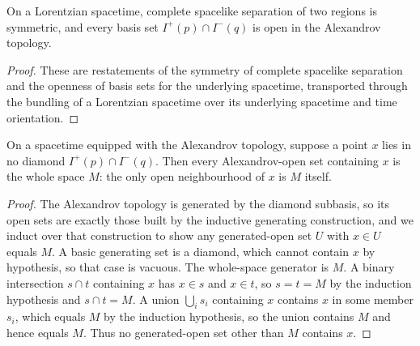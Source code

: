 \begin{lemma}
    \label{lmm:lorentzian-causal-lifts}
    \leanok
    On a Lorentzian spacetime, complete spacelike separation of two regions is symmetric, and every basis set $I^+(p) \cap I^-(q)$ is open in the Alexandrov topology.
\end{lemma}
\begin{proof}
    \leanok
    These are restatements of the symmetry of complete spacelike separation and the openness of basis sets for the underlying spacetime, transported through the bundling of a Lorentzian spacetime over its underlying spacetime and time orientation.
\end{proof}

\medskip

\begin{lemma}
    \label{lmm:alexandrov-nbhd-univ-of-no-diamond}
    \leanok
    On a spacetime equipped with the Alexandrov topology, suppose a point $x$ lies in no diamond $I^+(p) \cap I^-(q)$. Then every Alexandrov-open set containing $x$ is the whole space $M$: the only open neighbourhood of $x$ is $M$ itself.
\end{lemma}
\begin{proof}
    \leanok
    The Alexandrov topology is generated by the diamond subbasis, so its open sets are exactly those built by the inductive generating construction, and we induct over that construction to show any generated-open set $U$ with $x \in U$ equals $M$. A basic generating set is a diamond, which cannot contain $x$ by hypothesis, so that case is vacuous. The whole-space generator is $M$. A binary intersection $s \cap t$ containing $x$ has $x \in s$ and $x \in t$, so $s = t = M$ by the induction hypothesis and $s \cap t = M$. A union $\bigcup_i s_i$ containing $x$ contains $x$ in some member $s_i$, which equals $M$ by the induction hypothesis, so the union contains $M$ and hence equals $M$. Thus no generated-open set other than $M$ contains $x$.
\end{proof}


